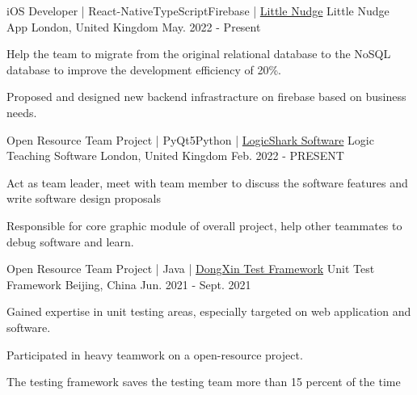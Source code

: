 

\begin{cventries}

  \cventry
    {iOS Developer | React-Native\acvHeaderIconSep\bullet\acvHeaderIconSep TypeScript\acvHeaderIconSep\bullet\acvHeaderIconSep Firebase | \href{https://github.com/jerryyangboyu/LogicShark}{\faHome\acvHeaderIconSep Little Nudge}}
    {Little Nudge App} %
    {London, United Kingdom} %
    {May. 2022 - Present} %
    {
      \begin{cvitems} %
        \item {Help the team to migrate from the original relational database to the NoSQL database to improve the development efficiency of 20\%.}
        \item {Proposed and designed new backend infrastracture on firebase based on business needs.}
      \end{cvitems}
    }

  \cventry
    {Open Resource Team Project | PyQt5\acvHeaderIconSep\bullet\acvHeaderIconSep Python | \href{https://github.com/jerryyangboyu/LogicShark}{\faGithubSquare\acvHeaderIconSep LogicShark Software}}
    {Logic Teaching Software} %
    {London, United Kingdom} %
    {Feb. 2022 - PRESENT} %
    {
      \begin{cvitems} %
        \item {Act as team leader, meet with team member to discuss the software features and write software design proposals}
        \item {Responsible for core graphic module of overall project, help other teammates to debug software and learn.}
      \end{cvitems}
    }

  \cventry
    {Open Resource Team Project | Java | \href{https://github.com/jerryyangboyu/dongxin-test-framework}{\faGithubSquare\acvHeaderIconSep DongXin Test Framework}}
    {Unit Test Framework} %
    {Beijing, China} %
    {Jun. 2021 - Sept. 2021} %
    {
      \begin{cvitems} %
        \item {Gained expertise in unit testing areas, especially targeted on web application and software.}
        \item {Participated in heavy teamwork on a open-resource project.}
        \item {The testing framework saves the testing team more than 15 percent of the time}
      \end{cvitems}
    }


\end{cventries}
